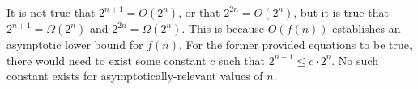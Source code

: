 It is not true that $2^{n+1} = O(2^n)$, or that $2^{2n} = O(2^n)$, but it is true that $2^{n+1} = \Omega(2^n)$ and $2^{2n} = \Omega(2^n)$. This is because $O(f(n))$ establishes an asymptotic lower bound for $f(n)$. For the former provided equations to be true, there would need to exist some constant $c$ such that $2^{n+1} \leq c \cdot 2^n$. No such constant exists for asymptotically-relevant values of $n$.